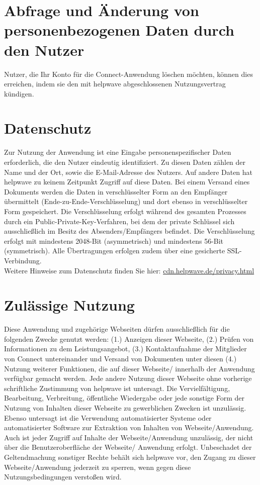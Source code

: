 \documentclass[10pt]{article}
\begin{document}
\section{Abfrage und Änderung von personenbezogenen Daten durch den Nutzer}
Nutzer, die Ihr Konto für die Connect-Anwendung löschen möchten, können dies erreichen, indem sie den mit helpwave abgeschlossenen Nutzungsvertrag kündigen.

\section{Datenschutz}
Zur Nutzung der Anwendung ist eine Eingabe personenspezifischer Daten erforderlich, die den Nutzer eindeutig identifiziert. Zu diesen Daten zählen der Name und der Ort, sowie die E-Mail-Adresse des Nutzers.
Auf andere Daten hat helpwave zu keinem Zeitpunkt Zugriff auf diese Daten. Bei einem Versand eines Dokuments werden die
Daten in verschlüsselter Form an den Empfänger übermittelt (Ende-zu-Ende-Verschlüsselung) und dort ebenso in verschlüsselter Form gespeichert. Die Verschlüsselung erfolgt während des gesamten Prozesses durch ein Public-Private-Key-Verfahren, bei dem der private Schlüssel sich ausschließlich im Besitz des Absenders/Empfängers befindet. Die Verschlüsselung
erfolgt mit mindestens 2048-Bit (asymmetrisch) und mindestens 56-Bit (symmetrisch). Alle Übertragungen erfolgen zudem
über eine gesicherte SSL-Verbindung. \\

Weitere Hinweise zum Datenschutz finden Sie hier: \href{https://cdn.helpwave.de/privacy.html}{cdn.helpwave.de/privacy.html}

\section{Zulässige Nutzung}
Diese Anwendung und zugehörige Webseiten dürfen ausschließlich für die folgenden Zwecke genutzt werden: (1.) Anzeigen
dieser Webseite, (2.) Prüfen von Informationen zu dem Leistungsangebot, (3.) Kontaktaufnahme der Mitglieder von Connect untereinander und Versand von Dokumenten unter diesen (4.) Nutzung weiterer Funktionen, die auf dieser Webseite/
innerhalb der Anwendung verfügbar gemacht werden. Jede andere Nutzung dieser Webseite ohne vorherige schriftliche
Zustimmung von helpwave ist untersagt. Die Vervielfältigung, Bearbeitung, Verbreitung, öffentliche Wiedergabe oder jede
sonstige Form der Nutzung von Inhalten dieser Webseite zu gewerblichen Zwecken ist unzulässig. Ebenso untersagt ist die
Verwendung automatisierter Systeme oder automatisierter Software zur Extraktion von Inhalten von Webseite/Anwendung.
Auch ist jeder Zugriff auf Inhalte der Webseite/Anwendung unzulässig, der nicht über die Benutzeroberfläche der Webseite/
Anwendung erfolgt. Unbeschadet der Geltendmachung sonstiger Rechte behält sich helpwave vor, den Zugang zu dieser
Webseite/Anwendung jederzeit zu sperren, wenn gegen diese Nutzungsbedingungen verstoßen wird.
\end{document}
